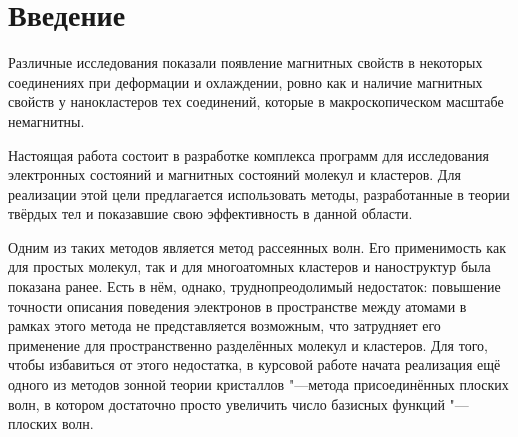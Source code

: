 \chapter*{Введение}                         %



Различные исследования\cite{localNerds1}\cite{localNerds2}\cite{SUNDARESAN200996}\cite{Venkatesan2004} показали
появление магнитных свойств в некоторых соединениях при деформации и охлаждении, ровно как и наличие магнитных свойств
у нанокластеров тех соединений, которые в макроскопическом масштабе немагнитны.

Настоящая работа состоит в разработке комплекса программ для исследования электронных состояний и магнитных состояний
молекул и кластеров. Для реализации этой цели предлагается использовать методы, разработанные в теории твёрдых тел
и показавшие свою эффективность в данной области.

Одним из таких методов является метод рассеянных волн\cite{sw-method}. Его применимость как для
простых молекул, так и для многоатомных кластеров и наноструктур была показана
ранее\cite{nyavro}. Есть в нём, однако, труднопреодолимый недостаток: повышение точности описания поведения
электронов в пространстве между атомами в рамках этого метода не представляется
возможным, что затрудняет его применение для пространственно разделённых молекул
и кластеров. Для того, чтобы избавиться от этого недостатка, в курсовой работе
начата реализация ещё одного из методов зонной теории кристаллов "---метода
присоединённых плоских волн\cite{afw-method}, в котором достаточно просто увеличить число
базисных функций "---плоских волн.

